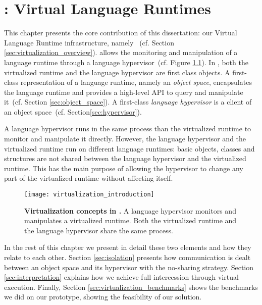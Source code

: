 

\chapter{\VTT: Virtual Language Runtimes}
\minitoc
\introduction

This chapter presents the core contribution of this dissertation: our Virtual Language Runtime infrastructure, namely \VTT~(cf. Section \ref{sec:virtualization_overview}). \VTT allows the monitoring and manipulation of a language runtime through a language hypervisor~(cf. Figure \ref{fig:virtualization_introduction}). In \VTT, both the virtualized runtime and the language hypervisor are first class objects. A first-class representation of a language runtime, namely an \emph{object space}, encapsulates the language runtime and provides a high-level API to query and manipulate it~(cf. Section \ref{sec:object_space}). A first-class \emph{language hypervisor} is a client of an object space~(cf. Section\ref{sec:hypervisor}).

A language hypervisor runs in the same process than the virtualized runtime to monitor and manipulate it directly. However, the language hypervisor and the virtualized runtime run on different language runtimes: basic objects, classes and \VM structures are not shared between the language hypervisor and the virtualized runtime. This has the main purpose of allowing the hypervisor to change any part of the virtualized runtime without affecting itself.

\begin{figure}[htb]
\begin{center}
\texttt{[image: virtualization\_introduction]}
\caption{\textbf{Virtualization concepts in \Vtt.} A language hypervisor monitors and manipulates a virtualized runtime. Both the virtualized runtime and the language hypervisor share the same process.\label{fig:virtualization_introduction}}
\end{center}
\end{figure}

In the rest of this chapter we present in detail these two elements and how they relate to each other. Section \ref{sec:isolation} presents how communication is dealt between an object space and its hypervisor with the no-sharing strategy.
Section \ref{sec:interpretation} explains how we achieve full intercession through virtual execution.
Finally, Section \ref{sec:virtualization_benchmarks} shows the benchmarks we did on our \Vtt prototype, showing the feasibility of our solution.

